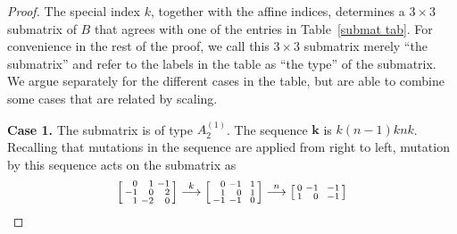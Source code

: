 \documentclass[10pt]{article}
\theoremstyle{definition}
\theoremstyle{remark}
\numberwithin{equation}{section}
\newcommand{\0}{{\mathbf{0}}}
\newcommand{\kk}{{\boldsymbol{k}}}
\begin{document}
\begin{proof}
The special index $k$, together with the affine indices, determines a $3\times3$ submatrix of $B$ that agrees with one of the entries in Table~\ref{submat tab}.
For convenience in the rest of the proof, we call this $3\times3$ submatrix merely ``the submatrix'' and refer to the labels in the table as ``the type'' of the submatrix.
We argue separately for the different cases in the table, but are able to combine some cases that are related by scaling.

\medskip

\noindent
\textbf{Case 1.}
The submatrix is of type $A_2^{(1)}$.
The sequence $\kk$ is $k(n-1)knk$.
Recalling that mutations in the sequence are applied from right to left, mutation by this sequence acts on the submatrix as
\begin{multline*}
\begin{bsmallmatrix*}[r]
0&1&-1\\
-1&0&2\\
1&-2&0
\end{bsmallmatrix*}
\overset{k}{\longrightarrow}
\begin{bsmallmatrix*}[r]
0&-1&\,\,\,1\\
1&0&1\\
-1&-1&0
\end{bsmallmatrix*}
\overset{n}{\longrightarrow}
\begin{bsmallmatrix*}[r]
0&-1&\,\,\,-1\\
1&0&-1\\

\end{bsmallmatrix*}
\end{multline*}
\end{proof}
\end{document}
